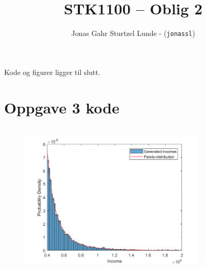 \documentclass[10pt,a4paper]{article}
\begin{document}
\title{STK1100 -- Oblig 2}
\author{
    \begin{tabular}{r l}
        Jonas Gahr Sturtzel Lunde - (\texttt{jonassl})
    \end{tabular}}
\date{}    %

\maketitle


Kode og figurer ligger til slutt.




\section*{Oppgave 3 kode}
\inputminted[frame=single, fontsize=\footnotesize]{MatLab}{oblig2.m}


\begin{figure}[H]
\centering
\includegraphics[width=0.8\textwidth]{pareto.png}
\end{figure}
\end{document}

